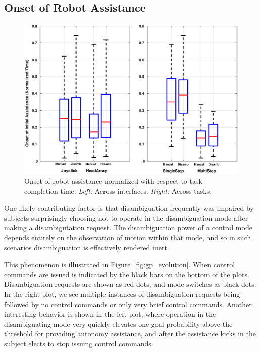 \subsection{Onset of Robot Assistance}\label{ssec:onset}
\begin{figure}[h!]
	\centering
	\includegraphics[width = 1\hsize ,center]{./finalfigures/Fig10.eps}
	\caption{Onset of robot assistance normalized with respect to task completion time. \textit{Left:} Across interfaces. \textit{Right:} Across tasks.}
	\label{fig:initial_blend}
\end{figure}

One likely contributing factor is that disambiguation frequently was impaired by subjects surprisingly choosing not to operate in the disambiguation mode after making a disambigutation request. The disambiguation power of a control mode depends entirely on the observation of motion within that mode, and so in such scenarios disambiguation is effectively rendered inert.

This phenomenon is illustrated in Figure~\ref{fig:gp_evolution}. When control commands are issued is indicated by the black bars on the bottom of the plots. Disambiguation requests are shown as red dots, and mode switches as black dots. In the right plot, we see multiple instances of disambiguation requests being followed by no control commands or only very brief control commands. Another interesting behavior is shown in the left plot, where operation in the disambiguating mode very quickly elevates one goal probability above the threshold for providing autonomy assistance, and after the assistance kicks in the subject elects to stop issuing control commands.



